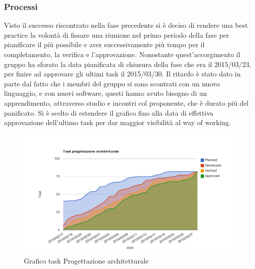 		\subsubsection{Processi}
		Visto il successo riscontrato nella fase precedente si è deciso di rendere una best practice la volontà di fissare una riunione nel primo periodo della fase per pianificare il più possibile e aver successivamente più tempo per il completamento, la verifica e l'approvazione. Nonostante quest'accorgimento il gruppo ha sforato la data pianificata di chiusura della fase che era il 2015/03/23, per finire ad approvare gli ultimi task il 2015/03/30. Il ritardo è stato dato in parte dal fatto che i membri del gruppo si sono scontrati con un nuovo linguaggio, e con nuovi software, questi hanno avuto bisogno di un apprendimento, attraverso studio e incontri col proponente, che è durato più del panificato. Si è scelto di estendere il grafico fino alla data di effettiva approvazione dell'ultimo task per dar maggior visibilità al way of working.
		\begin{figure}[htbp]
				\centering
				\centerline{\includegraphics[scale=1]{images/Grafico_fase_4.pdf}}
				\caption{Grafico task Progettazione architetturale}
				\label{fig:taskfase4}
			\end{figure}
			
